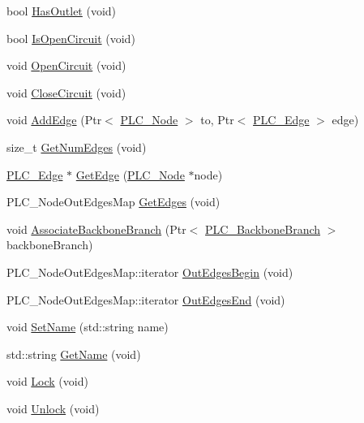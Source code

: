 \begin{DoxyCompactItemize}
\item 
bool \hyperlink{classns3_1_1PLC__Node_a8fc4a4502b1ba5df3462186a2b4fa940}{\-Has\-Outlet} (void)
\item 
bool \hyperlink{classns3_1_1PLC__Node_a6298bba852b3af995dcc7cfc63ffd290}{\-Is\-Open\-Circuit} (void)
\item 
void \hyperlink{classns3_1_1PLC__Node_a6cc2d90cc40afb47a31e8c684c373a15}{\-Open\-Circuit} (void)
\item 
void \hyperlink{classns3_1_1PLC__Node_af6560be99ff6e16d432a0e41faed79ea}{\-Close\-Circuit} (void)
\item 
void \hyperlink{classns3_1_1PLC__Node_aaa44f0ecd5020c1a7017a3481d6f7210}{\-Add\-Edge} (\-Ptr$<$ \hyperlink{classns3_1_1PLC__Node}{\-P\-L\-C\-\_\-\-Node} $>$ to, \-Ptr$<$ \hyperlink{classns3_1_1PLC__Edge}{\-P\-L\-C\-\_\-\-Edge} $>$ edge)
\item 
size\-\_\-t \hyperlink{classns3_1_1PLC__Node_a86ca49cbb5461a44b35f0bb5cf3de620}{\-Get\-Num\-Edges} (void)
\item 
\hyperlink{classns3_1_1PLC__Edge}{\-P\-L\-C\-\_\-\-Edge} $\ast$ \hyperlink{classns3_1_1PLC__Node_ada9176eadf2ae9c7b11bdd09153cd9fb}{\-Get\-Edge} (\hyperlink{classns3_1_1PLC__Node}{\-P\-L\-C\-\_\-\-Node} $\ast$node)
\item 
\-P\-L\-C\-\_\-\-Node\-Out\-Edges\-Map \hyperlink{classns3_1_1PLC__Node_aec97fb77345bd3c151e831301d1a32dc}{\-Get\-Edges} (void)
\item 
void \hyperlink{classns3_1_1PLC__Node_a46df7d06f7ee78a6c676571b62049f07}{\-Associate\-Backbone\-Branch} (\-Ptr$<$ \hyperlink{classns3_1_1PLC__BackboneBranch}{\-P\-L\-C\-\_\-\-Backbone\-Branch} $>$ backbone\-Branch)
\item 
\-P\-L\-C\-\_\-\-Node\-Out\-Edges\-Map\-::iterator \hyperlink{classns3_1_1PLC__Node_a6dfb62dfcf6272953b1627cea050b2fa}{\-Out\-Edges\-Begin} (void)
\item 
\-P\-L\-C\-\_\-\-Node\-Out\-Edges\-Map\-::iterator \hyperlink{classns3_1_1PLC__Node_a375b66ef51bfc6c0dae7a82022340210}{\-Out\-Edges\-End} (void)
\item 
void \hyperlink{classns3_1_1PLC__Node_a5d72e14ad1c2e07730a854371268d5bd}{\-Set\-Name} (std\-::string name)
\item 
std\-::string \hyperlink{classns3_1_1PLC__Node_aec3167f9b53ba7ebc932c86a88ee6316}{\-Get\-Name} (void)
\item 
void \hyperlink{classns3_1_1PLC__Node_afd5af9d69a6611cbd9bab8598cce37fb}{\-Lock} (void)
\item 
void \hyperlink{classns3_1_1PLC__Node_ab1c0af5debda14870430089e4522dca4}{\-Unlock} (void)

\end{DoxyCompactItemize}
